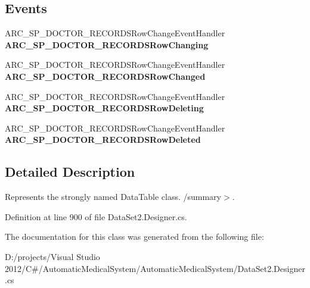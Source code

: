\subsection*{Events}
\begin{CompactItemize}
\item 
ARC\_\-SP\_\-DOCTOR\_\-RECORDSRowChangeEventHandler \textbf{ARC\_\-SP\_\-DOCTOR\_\-RECORDSRowChanging}\label{class_automatic_medical_system_1_1_data_set2_1_1_a_r_c___s_p___d_o_c_t_o_r___r_e_c_o_r_d_s_data_table_db959e98fe3faea2f9c7752f66de3ad3}

\item 
ARC\_\-SP\_\-DOCTOR\_\-RECORDSRowChangeEventHandler \textbf{ARC\_\-SP\_\-DOCTOR\_\-RECORDSRowChanged}\label{class_automatic_medical_system_1_1_data_set2_1_1_a_r_c___s_p___d_o_c_t_o_r___r_e_c_o_r_d_s_data_table_2da98e44aff9bfe31ae4bd93b9353e07}

\item 
ARC\_\-SP\_\-DOCTOR\_\-RECORDSRowChangeEventHandler \textbf{ARC\_\-SP\_\-DOCTOR\_\-RECORDSRowDeleting}\label{class_automatic_medical_system_1_1_data_set2_1_1_a_r_c___s_p___d_o_c_t_o_r___r_e_c_o_r_d_s_data_table_0ac4b462da292897252d4b25952deae7}

\item 
ARC\_\-SP\_\-DOCTOR\_\-RECORDSRowChangeEventHandler \textbf{ARC\_\-SP\_\-DOCTOR\_\-RECORDSRowDeleted}\label{class_automatic_medical_system_1_1_data_set2_1_1_a_r_c___s_p___d_o_c_t_o_r___r_e_c_o_r_d_s_data_table_b99b9bb7b860e3367dd2a1906b16baeb}

\end{CompactItemize}


\subsection{Detailed Description}
Represents the strongly named DataTable class. /summary$>$. 

Definition at line 900 of file DataSet2.Designer.cs.

The documentation for this class was generated from the following file:\begin{CompactItemize}
\item 
D:/projects/Visual Studio 2012/C\#/AutomaticMedicalSystem/AutomaticMedicalSystem/DataSet2.Designer.cs\end{CompactItemize}
